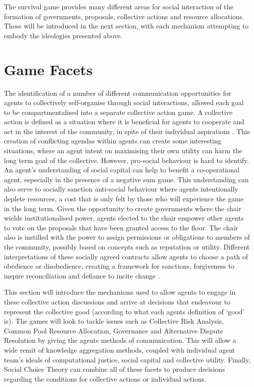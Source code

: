 The survival game provides many different areas for social interaction of the formation of governments, proposals, collective actions and resource allocations. These will be introduced in the next section, with each mechanism attempting to embody the ideologies presented above. 


\section{Game Facets}\label{sec: game facets}

The identification of a number of different communication opportunities for agents to collectively self-organise through social interactions, allowed each goal to be compartmentalised into a separate collective action game. A collective action is defined as a situation where it is beneficial for agents to cooperate and act in the interest of the community, in spite of their individual aspirations \cite{ober2008}. This creation of conflicting agendas within agents can create some interesting situations, where an agent intent on maximising their own utility can harm the long term goal of the collective. However, pro-social behaviour is hard to identify. An agent's understanding of social capital can help to benefit a co-operational agent, especially in the presence of a negative sum game. This understanding can also serve to socially sanction anti-social behaviour where agents intentionally deplete resources, a cost that is only felt by those who will experience the game in the long term. Given the opportunity to create governments where the chair wields institutionalised power, agents elected to the chair empower other agents to vote on the proposals that have been granted access to the floor. The chair also is instilled with the power to assign permissions or obligations to members of the community, possibly based on concepts such as reputation or utility. Different interpretations of these socially agreed contracts allow agents to choose a path of obedience or disobedience, creating a framework for sanctions, forgiveness to inspire reconciliation and defiance to incite change \cite{pitt}.

This section will introduce the mechanisms used to allow agents to engage in these collective action discussions and arrive at decisions that endeavour to represent the collective good (according to what each agents definition of `good' is). The games will look to tackle issues such as Collective Risk Analysis, Common Pool Resource Allocation, Governance and Alternative Dispute Resolution by giving the agents methods of communication. This will allow a wide remit of knowledge aggregation methods, coupled with individual agent team's ideals of computational justice, social capital and collective utility. Finally, Social Choice Theory can combine all of these facets to produce decisions regarding the conditions for collective actions or individual actions. 

